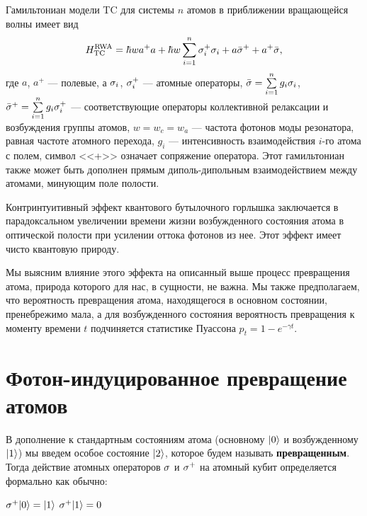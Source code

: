 Гамильтониан модели TC для системы $n$ атомов в приближении вращающейся волны \cite{ozhigov_qq,rwa_rabi_1,rwa_rabi_2} имеет вид
\[
H_{\text{\text{TC}}}^{\text{\text{RWA}}} = \hbar wa^{+}a + \hbar w\sum_{i=1}^{n}\sigma_{i}^{+}\sigma_{i} + a\bar{\sigma}^{+}+a^{+}\bar{\sigma},
\]
где $a$, $a^{+}$ --- полевые, а $\sigma_{i}$, $\sigma_{i}^{+}$ --- атомные операторы, $\bar{\sigma}=\sum\limits_{i=1}^{n}g_{i}\sigma_{i}$, $\bar{\sigma}^{+}=\sum\limits_{i=1}^ng_{i}\sigma^{+}_{i}$ --- соответствующие операторы коллективной релаксации и возбуждения группы атомов, $w = w_{c} = w_{a}$ --- частота фотонов моды резонатора, равная частоте атомного перехода, $g_{i}$ --- интенсивность взаимодействия $i$-го атома с полем, символ <<+>> означает сопряжение оператора. Этот гамильтониан также может быть дополнен прямым диполь-дипольным взаимодействием между атомами, минующим поле полости.

Контринтуитивный эффект квантового бутылочного горлышка заключается в парадоксальном увеличении времени жизни возбужденного состояния атома в оптической полости при усилении оттока фотонов из нее. Этот эффект имеет чисто квантовую природу.

Мы выясним влияние этого эффекта на описанный выше процесс превращения атома, природа которого для нас, в сущности, не важна. Мы также предполагаем, что вероятность превращения атома, находящегося в основном состоянии, пренебрежимо мала, а для возбужденного состояния вероятность превращения к моменту времени $t$ подчиняется статистике Пуассона $p_{t} = 1-e^{-\gamma t}$.

\section{Фотон-индуцированное превращение атомов}\label{sec:ch2/sec2}

В дополнение к стандартным состояниям атома (основному $|0\rangle$ и возбужденному $|1\rangle$) мы введем особое состояние $|2\rangle$, которое будем называть \textbf{превращенным}. Тогда действие атомных операторов $\sigma$ и $\sigma^{+}$ на атомный кубит определяется формально как обычно: 

\hspace{90pt}$\sigma^{+}|0\rangle = |1\rangle$
\hspace{90pt}$\sigma^{+}|1\rangle = 0$


